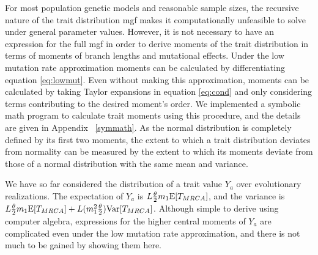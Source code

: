 \newcommand{\AAA}{\E[\mathbbm{T}_{4,4}] + \frac{1}{3}\E[\mathbbm{T}_{3,4}] + \frac{2}{9}\E[\mathbbm{T}_{2,4}]}
\newcommand{\BBB}{\frac{1}{9}\E[\mathbbm{T}_{2,4}] + \frac{1}{6}\E[\mathbbm{T}_{3,4}]}
\newcommand{\CCC}{\E[\mathbbm{T}_{4,4}] - \frac{1}{6}\E[\mathbbm{T}_{3,4}] - \frac{1}{9}\E[\mathbbm{T}_{2,4}]}

For most population genetic models and reasonable sample sizes, the recursive
nature of the trait distribution mgf makes it computationally unfeasible to
solve under general parameter values. However, it is not necessary to have an
expression for the full mgf in order to derive moments of the trait distribution
in terms of moments of branch lengths and mutational effects. Under the low
mutation rate approximation moments can be calculated by differentiating
equation \eqref{eq:lowmut}. Even without making this approximation, moments can
be calculated by taking Taylor expansions in equation \eqref{eq:cond} and only
considering terms contributing to the desired moment's order. We implemented a
symbolic math program to calculate trait moments using this procedure, and the
details are given in Appendix ~\ref{symmath}. As the normal distribution is
completely defined by its first two moments, the extent to which a trait
distribution deviates from normality can be measured by the extent to which its
moments deviate from those of a normal distribution with the same mean and
variance.

We have so far considered the distribution of a trait value $Y_a$ over
evolutionary realizations. The expectation of $Y_a$ is $L \frac{\theta}{2} m_1 \mathrm{E}[T_{MRCA}]$,
and the variance is $L \frac{\theta}{2} m_1 \mathrm{E}[T_{MRCA}] + L(m_1^2\frac{\theta}{2})\mathrm{Var}[T_{MRCA}]$. Although
simple to derive using computer algebra, expressions for the higher central
moments of $Y_a$ are complicated even under the low mutation rate approximation,
and there is not much to be gained by showing them here.

